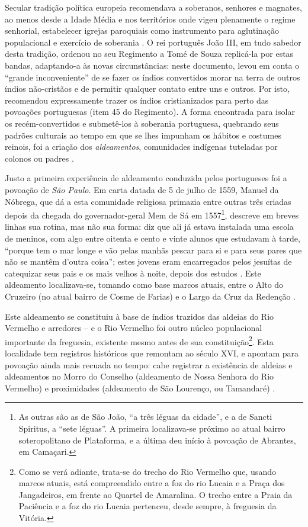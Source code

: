 Secular tradição política europeia recomendava a soberanos, senhores e magnates, ao menos desde a Idade Média e nos territórios onde vigeu plenamente o regime senhorial, estabelecer igrejas paroquiais como instrumento para aglutinação populacional e exercício de soberania \cite[pp.~193-205]{BERNARDO1997}. O rei português João III, em tudo sabedor desta tradição, ordenou no seu Regimento a Tomé de Souza replicá-la por estas bandas, adaptando-a às novas circunstâncias: neste documento, levou em conta o ``grande inconveniente'' de se fazer os índios convertidos morar na terra de outros índios não-cristãos e de permitir qualquer contato entre uns e outros. Por isto, recomendou expressamente trazer os índios cristianizados para perto das povoações portuguesas (item 45 do Regimento). A forma encontrada para isolar os recém-convertidos e submetê-los à soberania portuguesa, quebrando seus padrões culturais ao tempo em que se lhes impunham os hábitos e costumes reinois, foi a criação dos \textit{aldeamentos}, comunidades indígenas tuteladas por colonos ou padres \cite[pp.~72-76]{santos_salvador_2004}.

Justo a primeira experiência de aldeamento conduzida pelos portugueses foi a povoação de \textit{São Paulo}. Em carta datada de 5 de julho de 1559, Manuel da Nóbrega, que dá a esta comunidade religiosa primazia entre outras três criadas depois da chegada do governador-geral Mem de Sá em 1557\footnote{As outras são as de São João, ``a três léguas da cidade'', e a de Sancti Spiritus, a ``sete léguas''. A primeira localizava-se próximo ao atual bairro soteropolitano de Plataforma, e a última deu início à povoação de Abrantes, em Camaçari.}, descreve em breves linhas sua rotina, mas não sua forma: diz que ali já estava instalada uma escola de meninos, com algo entre oitenta e cento e vinte alunos que estudavam à tarde, ``porque tem o mar longe e vão pelas manhãs pescar para si e para seus pares que não se mantêm d'outra coisa''; estes jovens eram encarregados pelos jesuítas de catequizar seus pais e os mais velhos à noite, depois dos estudos \cite[p.~179]{nobrega_cartas_1931}. Este aldeamento localizava-se, tomando como base marcos atuais, entre o Alto do Cruzeiro (no atual bairro de Cosme de Farias) e o Largo da Cruz da Redenção \cite[p.~87]{campos_brotas_1942}.

Este aldeamento se constituiu à base de índios trazidos das aldeias do Rio Vermelho e arredores -- e o Rio Vermelho foi outro núcleo populacional importante da freguesia, existente mesmo antes de sua constituição\footnote{Como se verá adiante, trata-se do trecho do Rio Vermelho que, usando marcos atuais, está compreendido entre a foz do rio Lucaia e a Praça dos Jangadeiros, em frente ao Quartel de Amaralina. O trecho entre a Praia da Paciência e a foz do rio Lucaia pertenceu, desde sempre, à freguesia da Vitória.}. Esta localidade tem registros históricos que remontam ao século XVI, e apontam para povoação ainda mais recuada no tempo: cabe registrar a existência de aldeias e aldeamentos no Morro do Conselho (aldeamento de Nossa Senhora do Rio Vermelho) e proximidades (aldeamento de São Lourenço, ou Tamandaré) \cite[p.~75]{santos_salvador_2004}.

